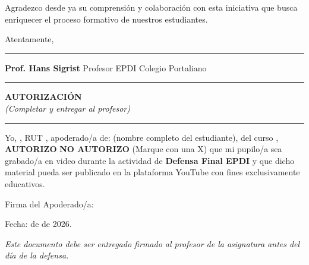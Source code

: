 \documentclass[
  spanish,
  11pt,
  letterpaper,
  DIV=11,
  numbers=noendperiod]{scrartcl}
\begin{document}
Agradezco desde ya su comprensión y colaboración con esta iniciativa que
busca enriquecer el proceso formativo de nuestros estudiantes.

Atentamente,

\rule{5cm}{0.4pt}

\textbf{Prof. Hans Sigrist} Profesor EPDI Colegio Portaliano

\vfill

\begin{center}
    \hrule
    \vspace{0.3cm}
    \textbf{\Large AUTORIZACIÓN}\\
    \textit{(Completar y entregar al profesor)}
    \vspace{0.3cm}
    \hrule
\end{center}

\vspace{0.3cm}

Yo, \underline{\hspace{6cm}}, RUT \underline{\hspace{4cm}}, apoderado/a
de: \newline \underline{\hspace{8cm}} (nombre completo del estudiante),
del curso \underline{\hspace{1cm}}, \newline \underline{\hspace{1cm}}
\textbf{AUTORIZO} \hspace{1cm} \underline{\hspace{1cm}}
\textbf{NO AUTORIZO} (Marque con una X) que mi pupilo/a sea grabado/a en
video durante la actividad de \textbf{Defensa Final EPDI} y que dicho
material pueda ser publicado en la plataforma YouTube con fines
exclusivamente educativos.

\vspace{0.5cm}

Firma del Apoderado/a: \underline{\hspace{6cm}}

\vspace{0.5cm}

Fecha: \underline{\hspace{1cm}} de \underline{\hspace{3cm}} de 2026.

\vfill

\begin{center}
    \textit{Este documento debe ser entregado firmado al profesor de la asignatura antes del día de la defensa.}
\end{center}
\end{document}
